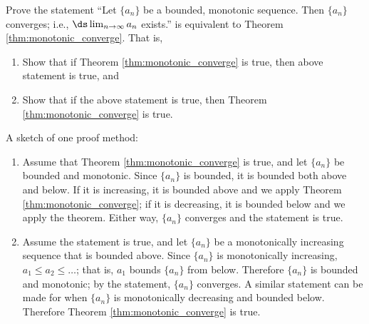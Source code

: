 {Prove the statement ``Let $\{a_n\}$ be a bounded, monotonic sequence. Then $\{a_n\}$ converges; i.e., $\ds \lim_{n \to\infty}a_n$ exists.'' is equivalent to Theorem \ref{thm:monotonic_converge}. That is,
	\begin{enumerate}
		\item Show that if Theorem \ref{thm:monotonic_converge} is true, then above statement is true, and
		\item	Show that if the above statement is true, then Theorem \ref{thm:monotonic_converge} is true.
	\end{enumerate}
}
{A sketch of one proof method:

\begin{enumerate}
	\item Assume that Theorem \ref{thm:monotonic_converge} is true, and let $\{a_n\}$ be bounded and monotonic. Since $\{a_n\}$ is bounded, it is bounded both above and below. If it is increasing, it is bounded above and we apply Theorem \ref{thm:monotonic_converge}; if it is decreasing, it is bounded below and we apply the theorem. Either way, $\{a_n\}$ converges and the statement is true.
	\item	Assume the statement is true, and let $\{a_n\}$ be a monotonically increasing sequence that is bounded above. Since $\{a_n\}$ is monotonically increasing, $a_1\leq a_2\leq \ldots$; that is, $a_1$ bounds $\{a_n\}$ from below. Therefore $\{a_n\}$ is bounded and monotonic; by the statement, $\{a_n\}$ converges. A similar statement can be made for when $\{a_n\}$ is monotonically decreasing and bounded below. Therefore Theorem \ref{thm:monotonic_converge} is true.
\end{enumerate}
}

